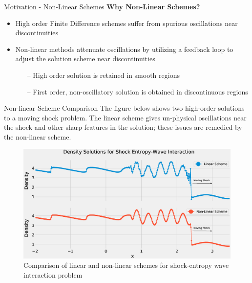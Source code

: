 \documentclass[9pt]{beamer}
\begin{document}
\begin{frame}{Motivation - Non-Linear Schemes}
\textbf{Why Non-Linear Schemes?}
\begin{itemize}
\item High order Finite Difference schemes suffer from spurious oscillations near discontinuities
\item Non-linear methods attenuate oscillations by utilizing a feedback loop to adjust the solution scheme near discontinuities
\begin{itemize}
\item[--] High order solution is retained in smooth regions 
\item[--] First order, non-oscillatory solution is obtained in discontinuous regions
\end{itemize}
\end{itemize}
\end{frame}



\begin{frame}{Non-linear Scheme Comparison}
The figure below shows two high-order solutions to a moving shock problem.  The linear scheme gives un-physical oscillations near the shock and other sharp features in the solution;  these issues are remedied by the non-linear scheme.
\begin{figure}[H]
\centering
\includegraphics[scale=0.25]{DensitySolutions.eps}\caption{Comparison of linear and non-linear schemes for shock-entropy wave interaction problem}
  \label{fig:BurgersZoom}
\end{figure}
\end{frame}
\end{document}
